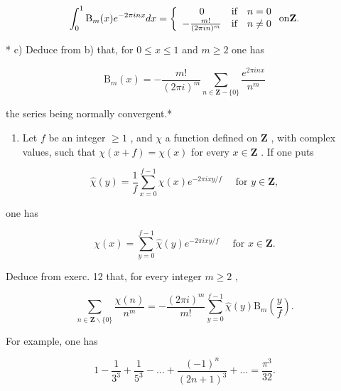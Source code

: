 \[
\int_ {0} ^ {1} \mathrm{B} _ {m} (x) e ^ {- 2 \pi i n x} d x = \left\{ \begin{array}{c c c} 0 & \text {if} & n = 0 \\ - \frac {m !}{(2 \pi i n) ^ {m}} & \text {if} & n \neq 0 \end{array} \right. \text {on} \mathbf {Z}.
\]

* c) Deduce from b) that, for \(0 \leqslant x \leqslant 1\) and \(m \geqslant 2\) one has

\[
\mathrm{B} _ {m} (x) = - \frac {m !}{(2 \pi i) ^ {m}} \sum_ {n \in \mathbf {Z} - \{0 \}} \frac {e ^ {2 \pi i n x}}{n ^ {m}}
\]

the series being normally convergent.*

\begin{enumerate}
\def\labelenumi{\arabic{enumi})}
\setcounter{enumi}{12}
\tightlist
\item
  Let \(f\) be an integer \(\geqslant 1\) , and \(\chi\) a function defined on \(\mathbf{Z}\) , with complex values, such that \(\chi(x + f) = \chi(x)\) for every \(x \in \mathbf{Z}\) . If one puts
\end{enumerate}

\[
\hat {\chi} (y) = \frac {1}{f} \sum_ {x = 0} ^ {f - 1} \chi (x) e ^ {- 2 \pi i x y / f} \quad \text { for } y \in \mathbf {Z},
\]

one has

\[
\chi (x) = \sum_ {y = 0} ^ {f - 1} \hat {\chi} (y) e ^ {- 2 \pi i x y / f} \quad \text {   for   } x \in \mathbf {Z}.
\]

Deduce from exerc. 12 that, for every integer \(m \geqslant 2\) ,

\[
\sum_ {n \in \mathbf {Z} \backslash \{0 \}} \frac {\chi (n)}{n ^ {m}} = - \frac {(2 \pi i) ^ {m}}{m !} \sum_ {y = 0} ^ {f - 1} \hat {\chi} (y) \mathrm{B} _ {m} \left(\frac {y}{f}\right).
\]

For example, one has

\[
1 - \frac {1}{3 ^ {3}} + \frac {1}{5 ^ {3}} - \dots + \frac {(- 1) ^ {n}}{(2 n + 1) ^ {3}} + \dots = \frac {\pi^ {3}}{3 2}.
\]

\setcounter{exercisegroup}{2}
